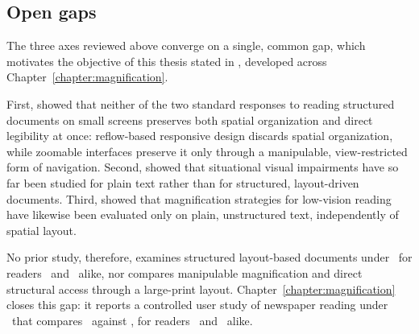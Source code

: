 \subsection{Open gaps}
\label{sec:sota-reading-gaps}

The three axes reviewed above converge on a single, common gap, which motivates the objective of this thesis stated in , developed across Chapter~\ref{chapter:magnification}.

First,  showed that neither of the two standard responses to reading structured documents on small screens preserves both spatial organization and direct legibility at once: reflow-based responsive design discards spatial organization, while zoomable interfaces preserve it only through a manipulable, view-restricted form of navigation. Second,  showed that situational visual impairments have so far been studied for plain text rather than for structured, layout-driven documents. Third,  showed that magnification strategies for low-vision reading have likewise been evaluated only on plain, unstructured text, independently of spatial layout.

No prior study, therefore, examines structured layout-based documents under \CVAS\ for readers \NV\ and \LV\ alike, nor compares manipulable magnification  and direct structural access through a large-print layout. Chapter~\ref{chapter:magnification} closes this gap: it reports a controlled user study of newspaper reading under \CVAS\ that compares \condone\ against \condtwo, for readers \NV\ and \LV\ alike.
